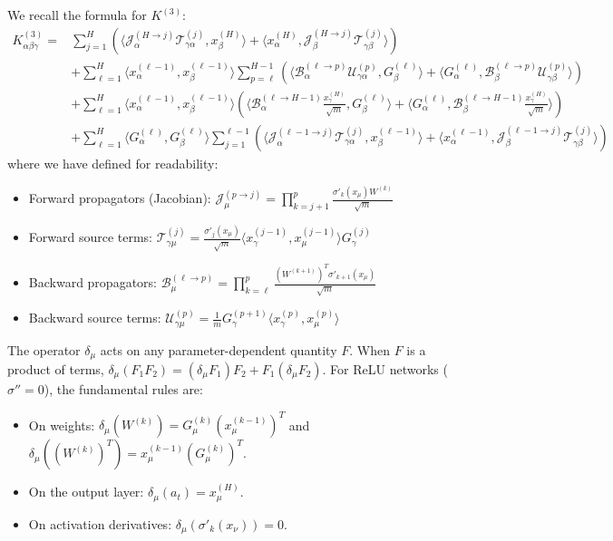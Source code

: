 \documentclass[11pt,a4paper]{article}
\theoremstyle{definition}
\begin{document}
We recall the formula for $K^{(3)}$:
\begin{align}
    K^{(3)}_{\alpha\beta\gamma} = & \sum_{j=1}^{H} \left( \langle \mathcal{J}^{(H \to j)}_{\alpha} \mathcal{T}^{(j)}_{\gamma\alpha}, x^{(H)}_\beta \rangle + \langle x^{(H)}_\alpha, \mathcal{J}^{(H \to j)}_{\beta} \mathcal{T}^{(j)}_{\gamma\beta} \rangle \right) \nonumber \\
    & + \sum_{\ell=1}^{H} \langle x^{(\ell-1)}_\alpha, x^{(\ell-1)}_\beta \rangle \sum_{p=\ell}^{H-1} \left( \langle \mathcal{B}^{(\ell \to p)}_{\alpha} \mathcal{U}^{(p)}_{\gamma\alpha}, G^{(\ell)}_\beta \rangle + \langle G^{(\ell)}_\alpha, \mathcal{B}^{(\ell \to p)}_{\beta} \mathcal{U}^{(p)}_{\gamma\beta} \rangle \right) \nonumber \\
    & + \sum_{\ell=1}^{H} \langle x^{(\ell-1)}_\alpha, x^{(\ell-1)}_\beta \rangle \left( \langle \mathcal{B}^{(\ell \to H-1)}_{\alpha} \frac{x^{(H)}_\gamma}{\sqrt{m}}, G^{(\ell)}_\beta \rangle + \langle G^{(\ell)}_\alpha, \mathcal{B}^{(\ell \to H-1)}_{\beta} \frac{x^{(H)}_\gamma}{\sqrt{m}} \rangle \right) \nonumber \\
    & + \sum_{\ell=1}^{H} \langle G^{(\ell)}_\alpha, G^{(\ell)}_\beta \rangle \sum_{j=1}^{\ell-1} \left( \langle \mathcal{J}^{(\ell-1 \to j)}_{\alpha} \mathcal{T}^{(j)}_{\gamma\alpha}, x^{(\ell-1)}_\beta \rangle + \langle x^{(\ell-1)}_\alpha, \mathcal{J}^{(\ell-1 \to j)}_{\beta} \mathcal{T}^{(j)}_{\gamma\beta} \rangle \right)
    \end{align}
    where we have defined for readability:
    \begin{itemize}
        \item Forward propagators (Jacobian): $\mathcal{J}^{(p \to j)}_{\mu} = \prod_{k=j+1}^{p} \frac{\sigma'_{k}(x_\mu) W^{(k)}}{\sqrt{m}}$
        \item Forward source terms: $\mathcal{T}^{(j)}_{\gamma\mu} = \frac{\sigma'_{j}(x_\mu)}{\sqrt{m}} \langle x^{(j-1)}_\gamma, x^{(j-1)}_\mu \rangle G^{(j)}_\gamma$
        \item Backward propagators: $\mathcal{B}^{(\ell \to p)}_{\mu} = \prod_{k=\ell}^{p} \frac{(W^{(k+1)})^T \sigma'_{k+1}(x_\mu)}{\sqrt{m}}$
        \item Backward source terms: $\mathcal{U}^{(p)}_{\gamma\mu} = \frac{1}{m} G^{(p+1)}_\gamma \langle x^{(p)}_\gamma, x^{(p)}_\mu \rangle$
    \end{itemize}
    
The operator $\delta_\mu$ acts on any parameter-dependent quantity $F$. When $F$ is a product of terms, $\delta_\mu(F_1 F_2) = (\delta_\mu F_1)F_2 + F_1(\delta_\mu F_2)$. For ReLU networks ($\sigma''=0$), the fundamental rules are:
\begin{itemize}
    \item On weights: $\delta_\mu(W^{(k)}) = G^{(k)}_\mu (x^{(k-1)}_\mu)^T$ and $\delta_\mu((W^{(k)})^T) = x^{(k-1)}_\mu (G^{(k)}_\mu)^T$.
    \item On the output layer: $\delta_\mu(a_t) = x^{(H)}_\mu$.
    \item On activation derivatives: $\delta_\mu(\sigma'_k(x_\nu)) = 0$.
\end{itemize}
\end{document}
